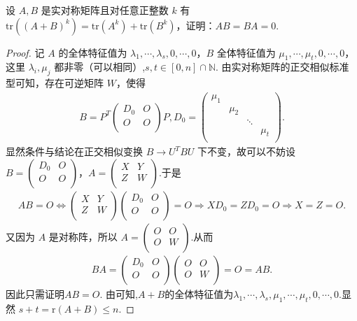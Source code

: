\documentclass[../../main.tex]{subfiles}%
\begin{document}
\begin{example}\label{example:例题611}
设 $A,B$ 是实对称矩阵且对任意正整数 $k$ 有 $\mathrm{tr}\left( \left( A+B \right) ^k \right) =\mathrm{tr}\left( A^k \right) +\mathrm{tr}\left( B^k \right) $，证明：$AB=BA=0$.
\end{example}
\begin{proof}
记 $A$ 的全体特征值为 $\lambda_1,\cdots,\lambda_s,0,\cdots,0$，$B$ 全体特征值为 $\mu_1,\cdots,\mu_t,0,\cdots,0$，这里 $\lambda_i,\mu_j$ 都非零（可以相同）,$s,t\in[0,n]\cap \mathbb{N}$.
由实对称矩阵的正交相似标准型可知，存在可逆矩阵 $W$，使得
\begin{align*}
B=P^T\begin{pmatrix}
D_0&		O\\
O&		O\\
\end{pmatrix}P,D_0=\begin{pmatrix}
\mu _1&		&		&		\\
&		\mu _2&		&		\\
&		&		\ddots&		\\
&		&		&		\mu _t\\
\end{pmatrix}.
\end{align*}
显然条件与结论在正交相似变换 $B\rightarrow U^TBU$ 下不变，故可以不妨设 $B=\begin{pmatrix}
D_0&		O\\
O&		O\\
\end{pmatrix}$，$A=\begin{pmatrix}
X&		Y\\
Z&		W\\
\end{pmatrix}$.于是
\begin{align*}
AB=O\Longleftrightarrow \begin{pmatrix}
X&		Y\\
Z&		W\\
\end{pmatrix} \begin{pmatrix}
D_0&		O\\
O&		O\\
\end{pmatrix} =O\Rightarrow XD_0=ZD_0=O\Rightarrow X=Z=O.
\end{align*}
又因为 $A$ 是对称阵，所以 $A=\begin{pmatrix}
O&		O\\
O&		W\\
\end{pmatrix}$.从而
\begin{align*}
BA = \begin{pmatrix}
D_0&		O\\
O&		O\\
\end{pmatrix}\begin{pmatrix}
O&		O\\
O&		W\\
\end{pmatrix} = O = AB.
\end{align*}
因此只需证明$AB=O$.
由可知,$A+B$的全体特征值为$\lambda _1,\cdots ,\lambda _s,\mu _1,\cdots ,\mu _t,0,\cdots ,0.$显然 $s+t=\mathrm{r}\left( A+B \right) \leqslant n$.


\end{proof}
\end{document}
